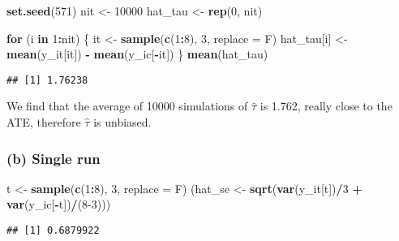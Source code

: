 \documentclass[]{article}
\newenvironment{Shaded}{\begin{snugshade}}{\end{snugshade}}
\newcommand{\ControlFlowTok}[1]{\textcolor[rgb]{0.13,0.29,0.53}{\textbf{#1}}}
\newcommand{\DataTypeTok}[1]{\textcolor[rgb]{0.13,0.29,0.53}{#1}}
\newcommand{\DecValTok}[1]{\textcolor[rgb]{0.00,0.00,0.81}{#1}}
\newcommand{\KeywordTok}[1]{\textcolor[rgb]{0.13,0.29,0.53}{\textbf{#1}}}
\newcommand{\NormalTok}[1]{#1}
\newcommand{\OperatorTok}[1]{\textcolor[rgb]{0.81,0.36,0.00}{\textbf{#1}}}
\newcommand{\StringTok}[1]{\textcolor[rgb]{0.31,0.60,0.02}{#1}}
\begin{document}
\begin{Shaded}
\begin{Highlighting}[]
\KeywordTok{set.seed}\NormalTok{(}\DecValTok{571}\NormalTok{)}
\NormalTok{nit <-}\StringTok{ }\DecValTok{10000}
\NormalTok{hat_tau <-}\StringTok{ }\KeywordTok{rep}\NormalTok{(}\DecValTok{0}\NormalTok{, nit)}

\ControlFlowTok{for}\NormalTok{ (i }\ControlFlowTok{in} \DecValTok{1}\OperatorTok{:}\NormalTok{nit) \{}
\NormalTok{  it <-}\StringTok{ }\KeywordTok{sample}\NormalTok{(}\KeywordTok{c}\NormalTok{(}\DecValTok{1}\OperatorTok{:}\DecValTok{8}\NormalTok{), }\DecValTok{3}\NormalTok{, }\DataTypeTok{replace =}\NormalTok{ F)}
\NormalTok{  hat_tau[i] <-}\StringTok{ }\KeywordTok{mean}\NormalTok{(y_it[it]) }\OperatorTok{-}\StringTok{ }\KeywordTok{mean}\NormalTok{(y_ic[}\OperatorTok{-}\NormalTok{it])}
\NormalTok{\}}
\KeywordTok{mean}\NormalTok{(hat_tau)}
\end{Highlighting}
\end{Shaded}

\begin{verbatim}
## [1] 1.76238
\end{verbatim}

We find that the average of 10000 simulations of \(\hat{\tau}\) is
1.762, really close to the ATE, therefore \(\hat{\tau}\) is unbiased.

\hypertarget{b-single-run}{%
\subsubsection{(b) Single run}\label{b-single-run}}

\begin{Shaded}
\begin{Highlighting}[]
\NormalTok{t <-}\StringTok{ }\KeywordTok{sample}\NormalTok{(}\KeywordTok{c}\NormalTok{(}\DecValTok{1}\OperatorTok{:}\DecValTok{8}\NormalTok{), }\DecValTok{3}\NormalTok{, }\DataTypeTok{replace =}\NormalTok{ F)}
\NormalTok{(hat_se <-}\StringTok{ }\KeywordTok{sqrt}\NormalTok{(}\KeywordTok{var}\NormalTok{(y_it[t])}\OperatorTok{/}\DecValTok{3} \OperatorTok{+}\StringTok{ }\KeywordTok{var}\NormalTok{(y_ic[}\OperatorTok{-}\NormalTok{t])}\OperatorTok{/}\NormalTok{(}\DecValTok{8-3}\NormalTok{)))}
\end{Highlighting}
\end{Shaded}

\begin{verbatim}
## [1] 0.6879922
\end{verbatim}
\end{document}

